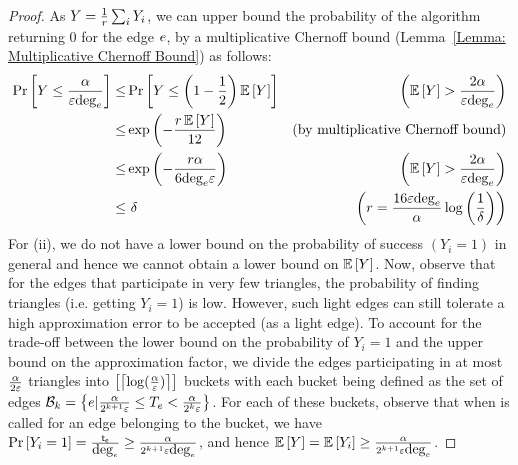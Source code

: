 \begin{proof}
    As $Y=\frac{1}{\querycount}\sum_i Y_i$, we can upper bound the probability of the algorithm returning $0$ for the edge $\edge$, by a multiplicative Chernoff bound (Lemma~\ref{Lemma: Multiplicative Chernoff Bound}) as follows:
    \begin{align*}
        \Pr\tbrac{Y \leq \frac{\arboricity}{\approxerror\degree{\edge}}} \remove{\complain{\mbox{(Debarshi: why is this } \frac{\arboricity}{\approxerror} \mbox{ and not } \frac{2 \arboricity}{\approxerror}?)}}
        \leq& \Pr\tbrac{Y \leq \fbrac{1-\frac{1}{2}}\Exp\tbrac{Y}} &\left( \Exp\tbrac{Y} > \frac{2\arboricity}{\approxerror\degree{\edge}} \right)\\
        \leq&\exp{\fbrac{-\frac{\querycount\Exp\tbrac{Y}}{12}}} &\text{(by multiplicative Chernoff bound)}\\
        \leq&\exp{\fbrac{-\frac{\querycount\arboricity}{6\degree{\edge}\approxerror}}} &\left( \Exp\tbrac{Y} > \frac{2\arboricity}{\approxerror\degree{\edge}}\right)\\
        \leq & ~ \confidence &\left( \querycount = \frac{16\approxerror \degree{\edge}}{\arboricity}\log\fbrac{\frac{1}{\confidence}}\right)\\
    \end{align*}
    For (ii), we do not have a lower bound on the probability of success $(Y_i = 1)$ in general and hence we cannot obtain a lower bound on $\Exp\tbrac{Y}$. Now, observe that for the edges that participate in very few triangles, the probability of finding triangles (i.e. getting $Y_i = 1$) is low. However, such light edges can still tolerate a high approximation error to be accepted (as a light edge). To account for the trade-off between the lower bound on the probability of $Y_i = 1$ and the upper bound on the approximation factor,
    we divide the edges participating in at most $\frac{\arboricity}{2\approxerror}$ triangles into $\tbrac{\ceil{\log(\frac{\arboricity}{\approxerror})}}$ buckets with each bucket being defined as the set of edges $\bucket_k = \sbrac{\edge|\frac{\arboricity}{2^{k+1}\approxerror}\leq\numtriangle_\edge < \frac{\arboricity}{2^k\approxerror}}$. For each of these buckets, observe that when \heavyoracle{} is called for an edge belonging to the bucket, we have $\Pr\tbrac{Y_i = 1} = \frac{\triangle_\edge}{\degree{\edge}} \geq \frac{\arboricity}{2^{k+1}\approxerror\degree{\edge}}$, and hence $\Exp\tbrac{Y} = \Exp\tbrac{Y_i} \geq \frac{\arboricity}{2^{k+1}\approxerror\degree{\edge}}$.
    

\end{proof}
